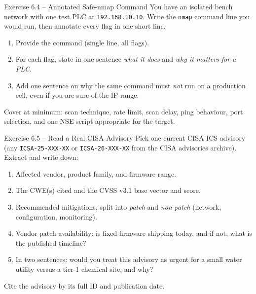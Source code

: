 \documentclass[11pt,a4paper]{article}
\begin{document}
\begin{taskbox}{Exercise 6.4 -- Annotated Safe-nmap Command}
You have an isolated bench network with one test PLC at
\texttt{192.168.10.10}. Write the \texttt{nmap} command line you would
run, then annotate every flag in one short line.

\begin{enumerate}
  \item Provide the command (single line, all flags).
  \item For each flag, state in one sentence \emph{what it does} and
        \emph{why it matters for a PLC}.
  \item Add one sentence on why the same command must \emph{not} run
        on a production cell, even if you are sure of the IP range.
\end{enumerate}
Cover at minimum: scan technique, rate limit, scan delay, ping
behaviour, port selection, and one NSE script appropriate for the
target.
\end{taskbox}

\begin{taskbox}{Exercise 6.5 -- Read a Real CISA Advisory}
Pick one current CISA ICS advisory (any \texttt{ICSA-25-XXX-XX} or
\texttt{ICSA-26-XXX-XX} from the CISA advisories archive). Extract and
write down:

\begin{enumerate}
  \item Affected vendor, product family, and firmware range.
  \item The CWE(s) cited and the CVSS v3.1 base vector and score.
  \item Recommended mitigations, split into \emph{patch} and
        \emph{non-patch} (network, configuration, monitoring).
  \item Vendor patch availability: is fixed firmware shipping today,
        and if not, what is the published timeline?
  \item In two sentences: would you treat this advisory as urgent for
        a small water utility versus a tier-1 chemical site, and why?
\end{enumerate}
Cite the advisory by its full ID and publication date.
\end{taskbox}
\end{document}
